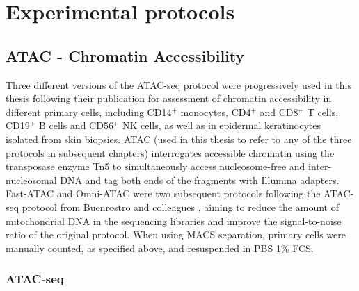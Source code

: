 \section{Experimental protocols}
\subsection{ATAC - Chromatin Accessibility}
\label{all_ATAC}
Three different versions of the ATAC-seq protocol were progressively used in this thesis following their publication for assessment of chromatin accessibility in different primary cells, including CD14$^{+}$ monocytes, CD4$^+$ and CD8$^+$ T cells, CD19$^+$ B cells and CD56$^+$ NK cells, as well as in epidermal keratinocytes isolated from skin biopsies. ATAC (used in this thesis to refer to any of the three protocols in subsequent chapters) interrogates accessible chromatin using the transposase enzyme Tn5 to simultaneously access nucleosome-free and inter-nucleosomal DNA and tag both ends of the fragments with Illumina adapters. Fast-ATAC and Omni-ATAC were two subsequent protocols following the ATAC-seq protocol from Buenrostro and colleagues \parencite{Buenrostro2013}, aiming to reduce the amount of mitochondrial DNA in the sequencing libraries and improve the signal-to-noise ratio of the original protocol. When using MACS separation, primary cells were manually counted, as specified above, and resuspended in PBS 1\% FCS.

\subsubsection{ATAC-seq}

